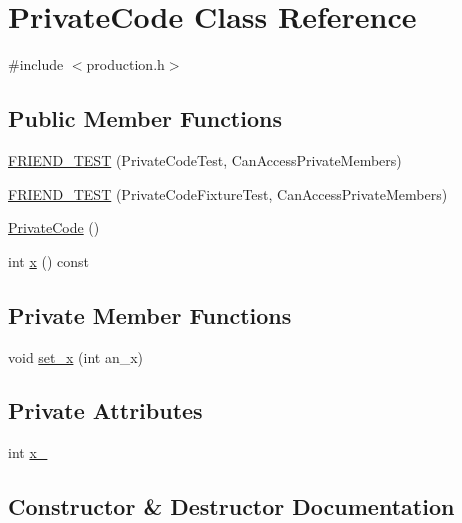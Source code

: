 \hypertarget{classPrivateCode}{}\section{Private\+Code Class Reference}
\label{classPrivateCode}


{\ttfamily \#include $<$production.\+h$>$}

\subsection*{Public Member Functions}
\begin{DoxyCompactItemize}
\item 
\hyperlink{classPrivateCode_a9a74a333501232539ab1636f0928d8f2}{F\+R\+I\+E\+N\+D\+\_\+\+T\+E\+ST} (Private\+Code\+Test, Can\+Access\+Private\+Members)
\item 
\hyperlink{classPrivateCode_a29b6823300f68d78691476eeeaed8a7c}{F\+R\+I\+E\+N\+D\+\_\+\+T\+E\+ST} (Private\+Code\+Fixture\+Test, Can\+Access\+Private\+Members)
\item 
\hyperlink{classPrivateCode_affe538411a99919d24ef09dffe1bb3eb}{Private\+Code} ()
\item 
int \hyperlink{classPrivateCode_a247781246ce4d0c66563eaa39ba5aaa9}{x} () const
\end{DoxyCompactItemize}
\subsection*{Private Member Functions}
\begin{DoxyCompactItemize}
\item 
void \hyperlink{classPrivateCode_a8d8ac6564d6425ea793f85848bb21b39}{set\+\_\+x} (int an\+\_\+x)
\end{DoxyCompactItemize}
\subsection*{Private Attributes}
\begin{DoxyCompactItemize}
\item 
int \hyperlink{classPrivateCode_a3590a614d8c76fa34fa4cea6f340c37f}{x\+\_\+}
\end{DoxyCompactItemize}


\subsection{Constructor \& Destructor Documentation}
\mbox{\label{classPrivateCode_affe538411a99919d24ef09dffe1bb3eb}} 

